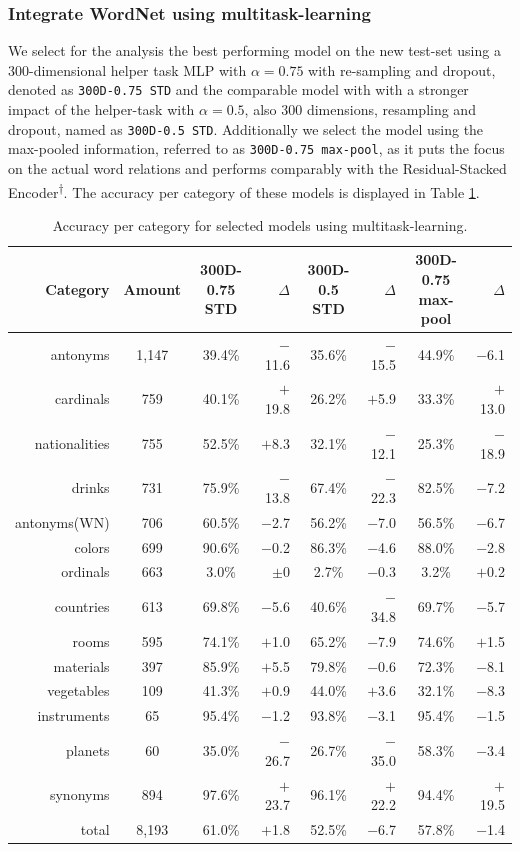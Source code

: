 \subsubsection{Integrate WordNet using multitask-learning}
We select for the analysis the best performing model on the new test-set using a 300-dimensional helper task \ac{MLP} with $\alpha=0.75$ with re-sampling and dropout, denoted as \texttt{300D-0.75 STD} and the comparable model with with a stronger impact of the helper-task with $\alpha=0.5$, also 300 dimensions, resampling and dropout, named as \texttt{300D-0.5 STD}. Additionally we select the model using the max-pooled information, referred to as \texttt{300D-0.75 max-pool}, as it puts the focus on the actual word relations and performs comparably with the Residual-Stacked Encoder\textsuperscript{$\dagger$}. The accuracy per category of these models is displayed in Table \ref{tab:categories_mt}.
\begin{table}[tph!]
\centering
\begin{tabular}{rc|cr|cr|cr}
\textbf{Category}  & \textbf{Amount}& \specialcellc{\textbf{300D-0.75}\\\textbf{STD}} & $\Delta$ &  \specialcellc{\textbf{300D-0.5}\\\textbf{STD}} & $\Delta$ & \specialcellc{\textbf{300D-0.75}\\\textbf{max-pool}} & $\Delta$\\
\toprule
antonyms & 1,147 & 39.4\% & $-$11.6 & 35.6\% & $-$15.5 & 44.9\% & $-$6.1 \\
cardinals & 759 & 40.1\% & $+$19.8 & 26.2\% & $+$5.9  & 33.3\% & $+$13.0\\
nationalities & 755 & 52.5\% & $+$8.3 & 32.1\% & $-$12.1 & 25.3\%  & $-$18.9\\
drinks & 731 & 75.9\% & $-$13.8 & 67.4\% & $-$22.3 & 82.5\% & $-$7.2\\
antonyms(WN) & 706 & 60.5\% & $-$2.7 & 56.2\% & $-$7.0 & 56.5\% & $-$6.7\\
colors & 699 & 90.6\% & $-$0.2 & 86.3\% & $-$4.6 & 88.0\% & $-$2.8\\
ordinals & 663 & 3.0\% & $\pm$0 & 2.7\% & $-$0.3 & 3.2\% & $+$0.2\\
countries & 613 & 69.8\% & $-$5.6 & 40.6\% & $-$34.8 & 69.7\% & $-$5.7\\
rooms & 595 & 74.1\% & $+$1.0 & 65.2\% & $-$7.9 & 74.6\% & $+$1.5\\
materials & 397 & 85.9\% & $+$5.5 & 79.8\% & $-$0.6 & 72.3\% & $-$8.1\\
vegetables & 109 & 41.3\% & $+$0.9 & 44.0\% & $+$3.6 & 32.1\% & $-$8.3\\
instruments & 65 & 95.4\% & $-$1.2 & 93.8\% & $-$3.1 & 95.4\% & $-$1.5\\
planets & 60 & 35.0\% & $-$26.7 & 26.7\% & $-$35.0 & 58.3\% & $-$3.4\\
\midrule
synonyms & 894 & 97.6\% & $+$23.7 & 96.1\% & $+$22.2 & 94.4\% & $+$19.5\\
\midrule
total & 8,193 & 61.0\% & $+$1.8 & 52.5\% & $-$6.7 & 57.8\% & $-$1.4\\
\bottomrule
\end{tabular}
\caption{Accuracy per category for selected models using multitask-learning.}
\label{tab:categories_mt}
\end{table}
